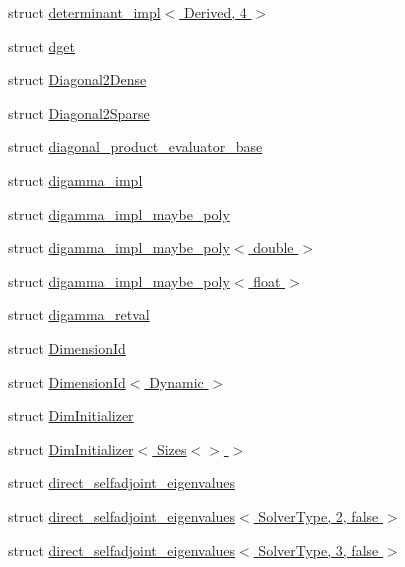 \begin{DoxyCompactItemize}
\item 
struct \hyperlink{struct_eigen_1_1internal_1_1determinant__impl_3_01_derived_00_014_01_4}{determinant\+\_\+impl$<$ Derived, 4 $>$}
\item 
struct \hyperlink{struct_eigen_1_1internal_1_1dget}{dget}
\item 
struct \hyperlink{struct_eigen_1_1internal_1_1_diagonal2_dense}{Diagonal2\+Dense}
\item 
struct \hyperlink{struct_eigen_1_1internal_1_1_diagonal2_sparse}{Diagonal2\+Sparse}
\item 
struct \hyperlink{struct_eigen_1_1internal_1_1diagonal__product__evaluator__base}{diagonal\+\_\+product\+\_\+evaluator\+\_\+base}
\item 
struct \hyperlink{struct_eigen_1_1internal_1_1digamma__impl}{digamma\+\_\+impl}
\item 
struct \hyperlink{struct_eigen_1_1internal_1_1digamma__impl__maybe__poly}{digamma\+\_\+impl\+\_\+maybe\+\_\+poly}
\item 
struct \hyperlink{struct_eigen_1_1internal_1_1digamma__impl__maybe__poly_3_01double_01_4}{digamma\+\_\+impl\+\_\+maybe\+\_\+poly$<$ double $>$}
\item 
struct \hyperlink{struct_eigen_1_1internal_1_1digamma__impl__maybe__poly_3_01float_01_4}{digamma\+\_\+impl\+\_\+maybe\+\_\+poly$<$ float $>$}
\item 
struct \hyperlink{struct_eigen_1_1internal_1_1digamma__retval}{digamma\+\_\+retval}
\item 
struct \hyperlink{struct_eigen_1_1internal_1_1_dimension_id}{Dimension\+Id}
\item 
struct \hyperlink{struct_eigen_1_1internal_1_1_dimension_id_3_01_dynamic_01_4}{Dimension\+Id$<$ Dynamic $>$}
\item 
struct \hyperlink{struct_eigen_1_1internal_1_1_dim_initializer}{Dim\+Initializer}
\item 
struct \hyperlink{struct_eigen_1_1internal_1_1_dim_initializer_3_01_sizes_3_4_01_4}{Dim\+Initializer$<$ Sizes$<$$>$ $>$}
\item 
struct \hyperlink{struct_eigen_1_1internal_1_1direct__selfadjoint__eigenvalues}{direct\+\_\+selfadjoint\+\_\+eigenvalues}
\item 
struct \hyperlink{struct_eigen_1_1internal_1_1direct__selfadjoint__eigenvalues_3_01_solver_type_00_012_00_01false_01_4}{direct\+\_\+selfadjoint\+\_\+eigenvalues$<$ Solver\+Type, 2, false $>$}
\item 
struct \hyperlink{struct_eigen_1_1internal_1_1direct__selfadjoint__eigenvalues_3_01_solver_type_00_013_00_01false_01_4}{direct\+\_\+selfadjoint\+\_\+eigenvalues$<$ Solver\+Type, 3, false $>$}

\end{DoxyCompactItemize}
